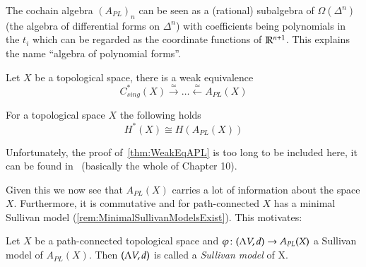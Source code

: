  The cochain algebra ${(A_{PL})}_n$ can be seen as a (rational) subalgebra of 
 $\Omega(\Delta^n)$ (the algebra of differential forms on  $\Delta^n$) with coefficients being polynomials in
 the $t_i$ which can be regarded as the coordinate functions of $\mathbb{R}^{n+1}$. This explains the name 
 ``algebra of polynomial forms''.
 
 \begin{Theorem}
\label{thm:WeakEqAPL}
  Let $X$ be a topological space, there is a weak equivalence 
  $${C^*_{sing}(X) \overset{\simeq}{\longrightarrow} \ldots \overset{\simeq}{\longleftarrow} A_{PL}(X)}$$
 \end{Theorem}
 
 \begin{Corollary}
  For a topological space $X$ the following holds
  $$ H^*(X) \cong H(A_{PL}(X)) $$
 \end{Corollary}

 Unfortunately, the proof of~\ref{thm:WeakEqAPL} is too long to be included here, it can be found
 in~\cite{Felix2001} (basically the whole of Chapter 10).

 Given this we now see that $A_{PL}(X)$ carries a lot of information about the space $X$. Furthermore, it is
 commutative and for path-connected $X$ has a minimal Sullivan model (\ref{rem:MinimalSullivanModelsExist}). This
 motivates:
 
 \begin{Definition}
  Let  $X$ be a path-connected topological space and $\varphi \colon (\Lambda V,d) \to A_{PL}(X)$ a Sullivan model of $A_{PL}(X)$. 
  Then $(\Lambda V,d) $ is called a \emph{Sullivan model} of X.
 \end{Definition}

